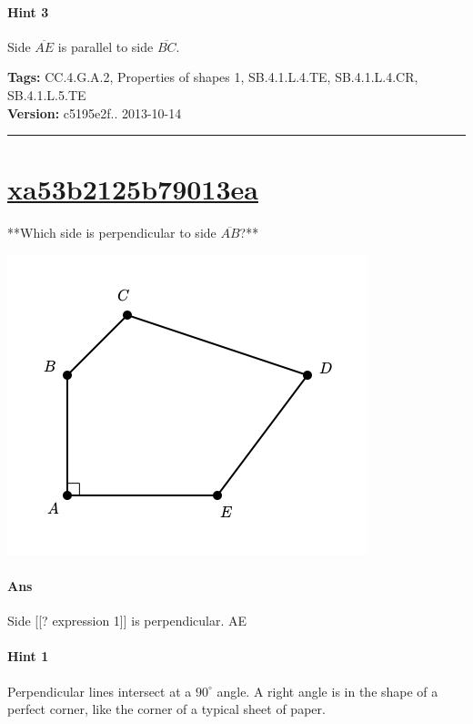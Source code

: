\documentclass[twocolumn,10pt]{article}
\def\shrinkfactor{0.55}
\begin{document}
\paragraph{Hint 3}Side $\overline{AE}$ is parallel to side $\overline{BC}$.



\medskip
\noindent
\textbf{Tags:} {\footnotesize CC.4.G.A.2, Properties of shapes 1, SB.4.1.L.4.TE, SB.4.1.L.4.CR, SB.4.1.L.5.TE}\\
\textbf{Version:} c5195e2f.. 2013-10-14
\smallskip\hrule





\section{\href{https://www.khanacademy.org/devadmin/content/items/xa53b2125b79013ea}{xa53b2125b79013ea}}

\noindent
**Which side is perpendicular to side $\overline{AB}$?**

\includegraphics[scale=\shrinkfactor]{figures/bfb555fa03fa87c5686e4050e123efb878484344.png}

\paragraph{Ans} Side  [[? expression 1]] is perpendicular.
  AE

\paragraph{Hint 1}Perpendicular lines intersect at a $90 ^\circ$ angle.  
A right angle is in the shape of a perfect corner, like the corner of a typical sheet of paper.
\end{document}
